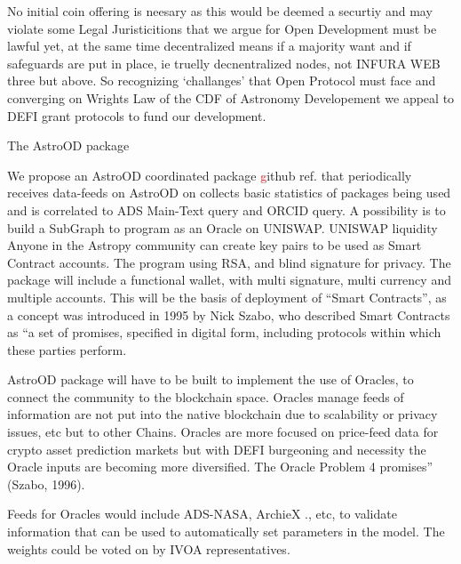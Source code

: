 \documentclass[final,5p,times,twocolumn,authoryear]{elsarticle}
\begin{document}
No initial coin offering is neesary as this would be deemed a securtiy and may violate some Legal Juristicitions that we argue for Open Development must be lawful yet, at the same time decentralized means if a majority want and if safeguards are put in place, ie truelly decnentralized nodes, not INFURA WEB three but above. So recognizing `challanges' that Open Protocol must face and converging on Wrights Law of the CDF of Astronomy Developement we appeal to DEFI grant protocols to fund our development. 


The AstroOD package 

We propose an AstroOD coordinated package \textcolor{red} github ref. that periodically receives data-feeds on AstroOD on collects basic statistics of packages being used and is correlated to ADS Main-Text query and ORCID query. A possibility is to build a SubGraph to program as an Oracle on UNISWAP. UNISWAP liquidity    Anyone in the Astropy community can create key pairs to be used as Smart Contract accounts. The program using RSA, and blind signature for privacy. The package will include a functional wallet, with multi signature, multi currency and multiple accounts. This will be the basis of deployment of “Smart Contracts”, as a concept was introduced in 1995 by Nick Szabo, who described Smart Contracts as “a set of promises,
specified in digital form, including protocols within which these parties perform.

AstroOD package will have to be built to implement the use of Oracles, to connect the community to the blockchain space. Oracles manage feeds of information are not put into the native blockchain due to scalability or privacy issues, etc but to other Chains.  Oracles are more focused on price-feed data for crypto asset prediction markets but with DEFI burgeoning and necessity the Oracle inputs are becoming more diversified.  The Oracle Problem 4 promises” (Szabo, 1996). 

Feeds for Oracles would include ADS-NASA, ArchieX ., etc,  to validate information that can be used to automatically set parameters in the model. The weights could be voted on by IVOA representatives.
\end{document}
